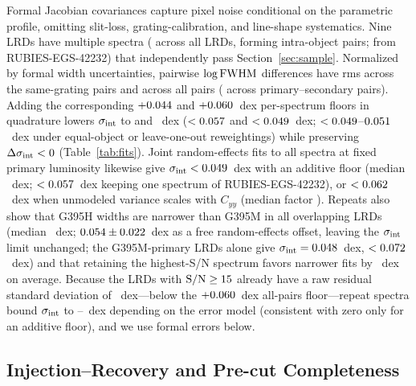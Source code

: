 \documentclass[twocolumn,linenumbers]{aastex701}
\newcommand{\sigint}{\sigma_{\rm int}}
\begin{document}
Formal Jacobian covariances capture pixel noise conditional on the parametric profile, omitting slit-loss, grating-calibration, and line-shape systematics.
Nine LRDs have multiple spectra (\NSpecPassLRD{} across all \NLRD{} LRDs, forming \NPairsAll{} intra-object pairs; \NPairsBigObj{} from RUBIES-EGS-42232) that independently pass Section~\ref{sec:sample}.
Normalized by formal width uncertainties, pairwise $\log{\rm FWHM}$ differences have rms \rmsDupSameG{} across the \NPairsSameG{} same-grating pairs and \rmsDupAll{} across all \NPairsAll{} pairs (\rmsDupBest{} across \NPairsBest{} primary--secondary pairs).
Adding the corresponding $+0.044{}$ and $+0.060{}$~dex per-spectrum floors in quadrature lowers $\sigint$ to \FsigFlrSame{} and \FsigFlrAll{}~dex ($<0.057{}$ and $<0.049{}$~dex; $<0.049{}$--$0.051{}$~dex under equal-object or leave-one-out reweightings) while preserving $\Delta\sigint<0$ (Table~\ref{tab:fits}).
Joint random-effects fits to all \NSpecPassLRD{} spectra at fixed primary luminosity likewise give $\sigint<\reAllUp{}$~dex with an additive floor (median \reAddFloor{}~dex; $<0.057{}$~dex keeping one spectrum of RUBIES-EGS-42232), or $<0.062{}$~dex when unmodeled variance scales with $C_{yy}$ (median factor \reMultScale{}).
Repeats also show that G395H widths are narrower than G395M in all \NGHobj{} overlapping LRDs (median \dWGH{}~dex; $0.054{}\pm0.022{}$~dex as a free random-effects offset, leaving the $\sigint$ limit unchanged; the \NGM{} G395M-primary LRDs alone give $\sigint=\FsigGM{}$~dex, $<0.072{}$~dex) and that retaining the highest-S/N spectrum favors narrower fits by \dWPrim{}~dex on average.
Because the \NSNfif{} LRDs with ${\rm S/N}\geq15$ already have a raw residual standard deviation of \rmsSNfif{}~dex---below the $+0.060{}$~dex all-pairs floor---repeat spectra bound $\sigint$ to \reAllUp{}--\reMultUp{}~dex depending on the error model (consistent with zero only for an additive floor), and we use formal errors below.

\subsection{Injection--Recovery and Pre-cut Completeness} \label{sec:injtests}
\end{document}

